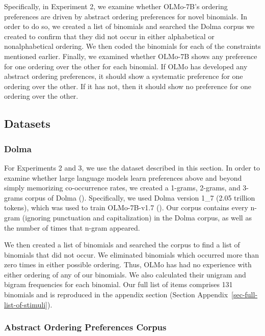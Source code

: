 \documentclass[
  12pt,
  letterpaper,
]{scrreport}
\begin{document}
Specifically, in Experiment 2, we examine whether OLMo-7B's ordering
preferences are driven by abstract ordering preferences for novel
binomials. In order to do so, we created a list of binomials and
searched the Dolma corpus we created to confirm that they did not occur
in either alphabetical or nonalphabetical ordering. We then coded the
binomials for each of the constraints mentioned earlier. Finally, we
examined whether OLMo-7B shows any preference for one ordering over the
other for each binomial. If OLMo has developed any abstract ordering
preferences, it should show a systematic preference for one ordering
over the other. If it has not, then it should show no preference for one
ordering over the other.

\subsection{Datasets}\label{datasets}

\subsubsection{Dolma}\label{dolma}

For Experiments 2 and 3, we use the dataset described in this section.
In order to examine whether large language models learn preferences
above and beyond simply memorizing co-occurrence rates, we created a
1-grams, 2-grams, and 3-grams corpus of Dolma
().
Specifically, we used Dolma version 1\_7 (2.05 trillion tokens), which
was used to train OLMo-7B-v1.7
(). Our corpus contains every n-gram (ignoring punctuation and
capitalization) in the Dolma corpus, as well as the number of times that
n-gram appeared.

We then created a list of binomials and searched the corpus to find a
list of binomials that did not occur. We eliminated binomials which
occurred more than zero times in either possible ordering. Thus, OLMo
has had no experience with either ordering of any of our binomials. We
also calculated their unigram and bigram frequencies for each binomial.
Our full list of items comprises 131 binomials and is reproduced in the
appendix section (Section Appendix~\ref{sec-full-list-of-stimuli}).

\subsubsection{Abstract Ordering Preferences
Corpus}\label{abstract-ordering-preferences-corpus}
\end{document}

